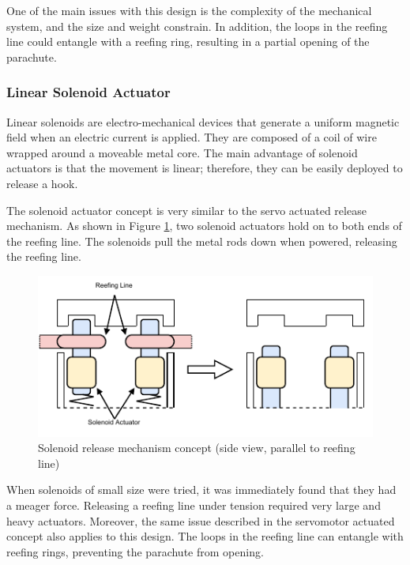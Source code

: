 \newpage

One of the main issues with this design is the complexity of the mechanical system, and the size and weight constrain. In addition, the loops in the reefing line could entangle with a reefing ring, resulting in a partial opening of the parachute. 

\subsubsection{Linear Solenoid Actuator}
Linear solenoids are electro-mechanical devices that generate a uniform magnetic field when an electric current is applied. They are composed of a coil of wire wrapped around a moveable metal core. The main advantage of solenoid actuators is that the movement is linear; therefore, they can be easily deployed to release a hook.\cite{solenoid-actuator}

The solenoid actuator concept is very similar to the servo actuated release mechanism. As shown in Figure \ref{fig:solenoid}, two solenoid actuators hold on to both ends of the reefing line. The solenoids pull the metal rods down when powered, releasing the reefing line. 

\begin{figure}[h!]
	\centering
	\includegraphics[width=\textwidth]{images/solenoid}
	\caption{Solenoid release mechanism concept (side view, parallel to reefing line)}
	\label{fig:solenoid}
\end{figure}

When solenoids of small size were tried, it was immediately found that they had a meager force. Releasing a reefing line under tension required very large and heavy actuators. Moreover, the same issue described in the servomotor actuated concept also applies to this design. The loops in the reefing line can entangle with reefing rings, preventing the parachute from opening. 

